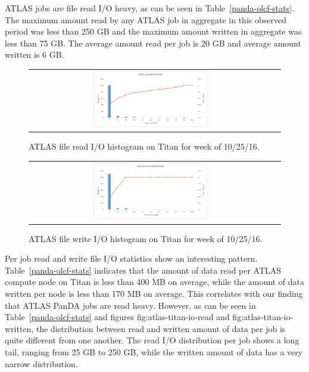 ATLAS jobs are file read I/O heavy, as can be seen in
Table~\ref{panda-olcf-stats}. The maximum amount read by any ATLAS job in
aggregate in this observed period was less than 250 GB and the maximum amount
written in aggregate was less than 75 GB. The average amount read per job is 20
GB and average amount written is 6 GB.  

\begin{figure}[!htb]
    \centering
    \begin{tabular}{cc}
        {\includegraphics[width=0.48\textwidth]{figures/panda_data_read_hist.pdf}}\\
    \end{tabular}
    \caption{ATLAS file read I/O histogram on Titan for week of 10/25/16.}
    \label{fig:atlas-titan-io-read}
\end{figure}



\begin{figure}[!htb]
    \centering
    \begin{tabular}{cc}
        {\includegraphics[width=0.48\textwidth]{figures/panda_data_written_hist.pdf}}\\
    \end{tabular}
    \caption{ATLAS file write I/O histogram on Titan for week of 10/25/16.}
    \label{fig:atlas-titan-io-written}
\end{figure}


Per job read and write file I/O statistics show an interesting pattern.
Table~\ref{panda-olcf-stats} indicates that the amount of data read per ATLAS
compute node on Titan is less than 400 MB on average, while the amount of data
written per node is less than 170 MB on average. This correlates with our
finding that ATLAS PanDA jobs are read heavy. However, as can be seen in
Table~\ref{panda-olcf-stats} and figures {fig:atlas-titan-io-read} and
{fig:atlas-titan-io-written}, the distribution between read and written amount
of data per job is quite different from one another. The read I/O distribution
per job shows a long tail, ranging from 25 GB to 250 GB, while the written
amount of data has a very narrow distribution.  

